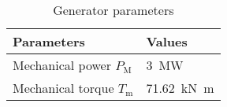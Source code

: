 \documentclass{article}
\begin{document}
\begin{table}[!h]
        \caption{Generator parameters}
        \label{tab:genparameters}
        \centering
        \begin{tabular}{ll}
                \toprule
                Parameters & Values \\
                \midrule
                Mechanical power $P_{\mathrm{M}}$ & \SI{3}{\mega\watt} \\
                Mechanical torque $T_{\mathrm{m}}$ & \SI{71.62}{\kilo\newton\meter} \\
                \bottomrule
        \end{tabular}
\end{table}
\end{document}

